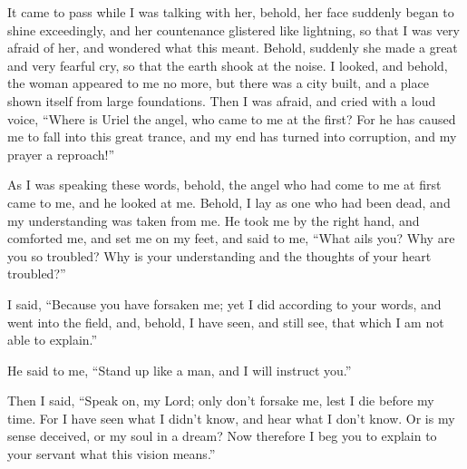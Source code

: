  It came to pass while I was talking with her, behold, her
face suddenly began to shine exceedingly, and her countenance glistered
like lightning, so that I was very afraid of her, and wondered what this
meant.  Behold, suddenly she made a great and very fearful
cry, so that the earth shook at the noise.  I looked, and
behold, the woman appeared to me no more, but there was a city built,
and a place shown itself from large foundations. Then I was afraid, and
cried with a loud voice,  ``Where is Uriel the angel, who
came to me at the first? For he has caused me to fall into this great
trance, and my end has turned into corruption, and my prayer a
reproach!''

 As I was speaking these words, behold, the angel who had
come to me at first came to me, and he looked at me. 
Behold, I lay as one who had been dead, and my understanding was taken
from me. He took me by the right hand, and comforted me, and set me on
my feet, and said to me,  ``What ails you? Why are you so
troubled? Why is your understanding and the thoughts of your heart
troubled?''

 I said, ``Because you have forsaken me; yet I did
according to your words, and went into the field, and, behold, I have
seen, and still see, that which I am not able to explain.''

 He said to me, ``Stand up like a man, and I will instruct
you.''

 Then I said, ``Speak on, my Lord; only don't forsake me,
lest I die before my time.  For I have seen what I didn't
know, and hear what I don't know.  Or is my sense deceived,
or my soul in a dream?  Now therefore I beg you to explain
to your servant what this vision means.''

